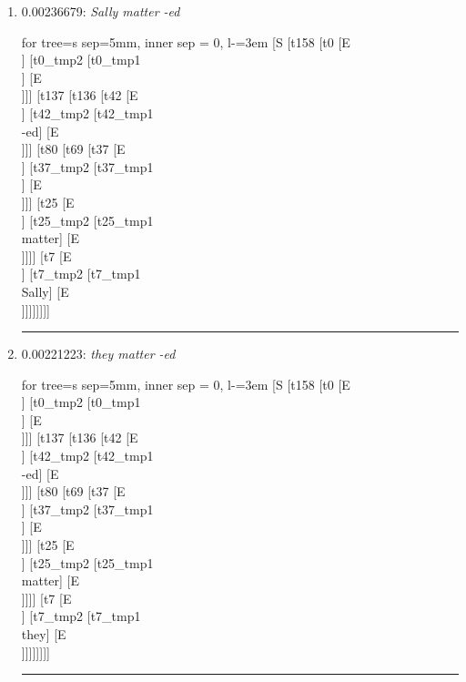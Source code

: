 \documentclass[11pt]{article}
\begin{document}
\begin{enumerate}
	\item  0.00236679: \textit{Sally matter -ed} \\[0.5em]
	\begin{forest}
	for tree={s sep=5mm, inner sep = 0, l-=3em}
	[S [t158 [t0 [E\\ ] [t0_tmp2 [t0_tmp1\\ ] [E\\ ]]] [t137 [t136 [t42 [E\\ ] [t42_tmp2 [t42_tmp1\\-ed] [E\\ ]]] [t80 [t69 [t37 [E\\ ] [t37_tmp2 [t37_tmp1\\ ] [E\\ ]]] [t25 [E\\ ] [t25_tmp2 [t25_tmp1\\matter] [E\\ ]]]] [t7 [E\\ ] [t7_tmp2 [t7_tmp1\\Sally] [E\\ ]]]]]]]]
	\end{forest}
	\vspace{2\baselineskip}
	\hrule

	\item  0.00221223: \textit{they matter -ed} \\[0.5em]
	\begin{forest}
	for tree={s sep=5mm, inner sep = 0, l-=3em}
	[S [t158 [t0 [E\\ ] [t0_tmp2 [t0_tmp1\\ ] [E\\ ]]] [t137 [t136 [t42 [E\\ ] [t42_tmp2 [t42_tmp1\\-ed] [E\\ ]]] [t80 [t69 [t37 [E\\ ] [t37_tmp2 [t37_tmp1\\ ] [E\\ ]]] [t25 [E\\ ] [t25_tmp2 [t25_tmp1\\matter] [E\\ ]]]] [t7 [E\\ ] [t7_tmp2 [t7_tmp1\\they] [E\\ ]]]]]]]]
	\end{forest}
	\vspace{2\baselineskip}
	\hrule


\end{enumerate}
\end{document}
